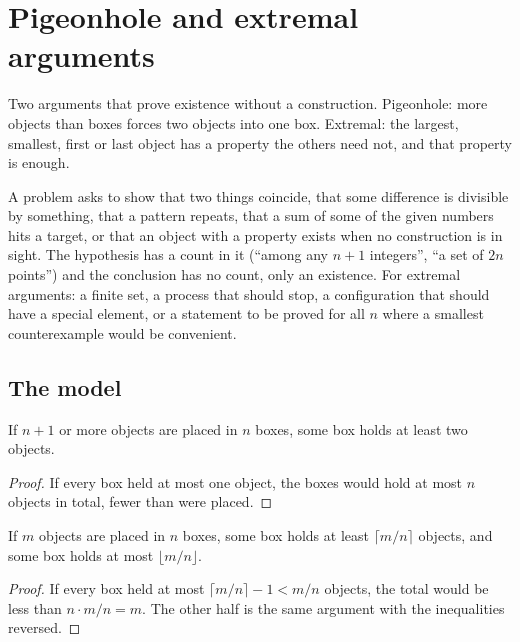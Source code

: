 \section{Pigeonhole and extremal arguments}
\label{sec:pigeonhole}

Two arguments that prove existence without a construction. Pigeonhole: more objects than boxes forces two objects into one box. Extremal: the largest, smallest, first or last object has a property the others need not, and that property is enough.

\begin{recognise}
A problem asks to show that two things coincide, that some difference is divisible by something, that a pattern repeats, that a sum of some of the given numbers hits a target, or that an object with a property exists when no construction is in sight. The hypothesis has a count in it (``among any $n+1$ integers'', ``a set of $2n$ points'') and the conclusion has no count, only an existence. For extremal arguments: a finite set, a process that should stop, a configuration that should have a special element, or a statement to be proved for all $n$ where a smallest counterexample would be convenient.
\end{recognise}

\subsection*{The model}

\begin{theorem}
If $n + 1$ or more objects are placed in $n$ boxes, some box holds at least two objects.
\end{theorem}

\begin{proof}
If every box held at most one object, the boxes would hold at most $n$ objects in total, fewer than were placed.
\end{proof}

\begin{theorem}
If $m$ objects are placed in $n$ boxes, some box holds at least $\lceil m/n \rceil$ objects, and some box holds at most $\lfloor m/n \rfloor$.
\end{theorem}

\begin{proof}
If every box held at most $\lceil m/n \rceil - 1 < m/n$ objects, the total would be less than $n \cdot m/n = m$. The other half is the same argument with the inequalities reversed.
\end{proof}


